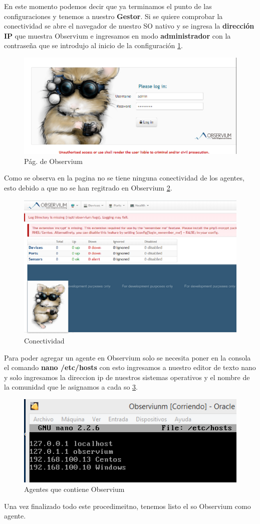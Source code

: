 En este momento podemos decir que ya terminamos el punto de las configuraciones y tenemos a nuestro \textbf{Gestor}.
Si  se quiere comprobar la  conectividad se abre el navegador de nuestro SO nativo y se ingresa la \textbf{dirección IP} que muestra Observium e ingresamos en modo \textbf{administrador} con la contraseña que se  introdujo al inicio de la configuración \ref{image:observium}.

\FloatBarrier
\begin{figure}[htbp!]
		\centering
			\includegraphics[width=.5 \textwidth]{../images/3-Observium.png}
		\caption{Pág. de Observium}
		\label{image:observium}
\end{figure}
\FloatBarrier

Como se observa en la pagina no se tiene ninguna conectividad de los agentes, esto debido a que no se han regitrado en Observium \ref{image:pag}.

\FloatBarrier
\begin{figure}[htbp!]
		\centering
			\includegraphics[width=.7 \textwidth]{../images/4-Observium.png}
		\caption{Conectividad}
		\label{image:pag}
\end{figure}
\FloatBarrier

Para poder agregar un agente en Observium solo se necesita poner en la consola el comando \textbf{nano /etc/hosts} con esto ingresamos a nuestro editor de texto nano y solo ingresamos la direccion ip de nuestros sistemas operativos y el nombre de la comunidad que le asignamos a cada so \ref{image:agente}.

\FloatBarrier
\begin{figure}[htbp!]
		\centering
			\includegraphics[width=.5 \textwidth]{../images/5-Observium.png}
		\caption{Agentes que contiene Observium}
		\label{image:agente}
\end{figure}
\FloatBarrier

Una vez finalizado todo este procedimeitno, tenemos listo el so Observium como agente.


